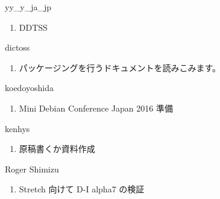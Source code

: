\begin{prework}{ yy\_y\_ja\_jp }
  \begin{enumerate}
  \item DDTSS
  \end{enumerate}
\end{prework}

\begin{prework}{ dictoss }
  \begin{enumerate}
  \item パッケージングを行うドキュメントを読みこみます。
  \end{enumerate}
\end{prework}

\begin{prework}{ koedoyoshida }
  \begin{enumerate}
  \item Mini Debian Conference Japan 2016 準備
  \end{enumerate}
\end{prework}

\begin{prework}{ kenhys }
  \begin{enumerate}
  \item 原稿書くか資料作成
  \end{enumerate}
\end{prework}

\begin{prework}{ Roger Shimizu }
  \begin{enumerate}
  \item Stretch 向けて D-I alpha7 の検証
  \end{enumerate}
\end{prework}
